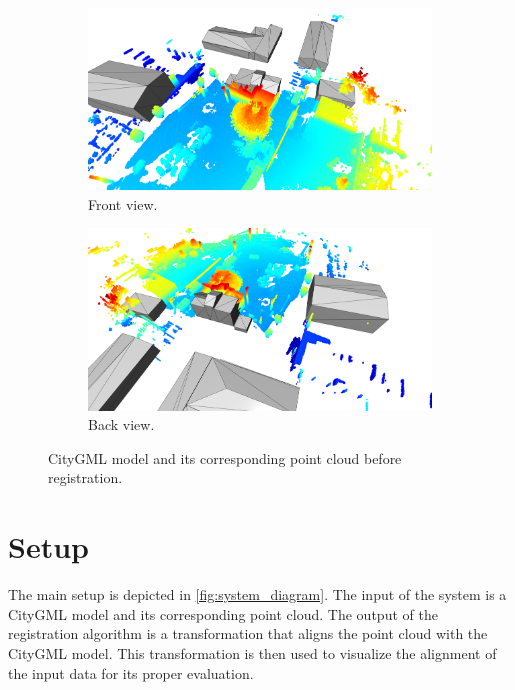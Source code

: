         \begin{figure}[htp]
            \centering
            \begin{subfigure}{1\textwidth}
                \centering
                \includegraphics[scale=0.2]{images/solution_images/initial_front_model.png}
                \caption{Front view.}
                \label{fig:initial_front_model}
            \end{subfigure}
            \hfill
            \begin{subfigure}{1\textwidth}
                \centering
                \includegraphics[scale=0.2]{images/solution_images/initial_back_model.png}
                \caption{Back view.}
                \label{fig:initial_back_model}
            \end{subfigure}
            \caption{CityGML model and its corresponding point cloud before registration.}
            \label{fig:initial_CityGML}
        \end{figure}

    \section{Setup}
        The main setup is depicted in \autoref{fig:system_diagram}.
        The input of the system is a CityGML model and its corresponding point cloud. 
        The output of the registration algorithm is a transformation that aligns the point cloud with the CityGML model.
        This transformation is then used to visualize the alignment of the input data for its proper evaluation.

